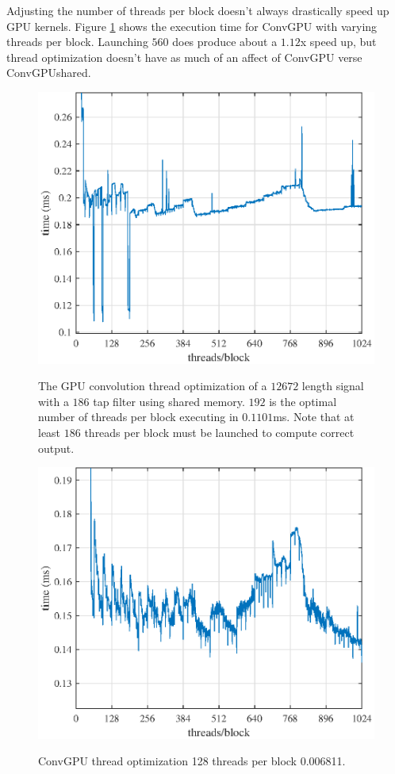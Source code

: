 Adjusting the number of threads per block doesn't always drastically speed up GPU kernels.
Figure \ref{fig:ConvGPU_shared_12672_186taps} shows the execution time for ConvGPU with varying threads per block.
Launching $560$ does produce about a $1.12$x speed up, but thread optimization doesn't have as much of an affect of ConvGPU verse ConvGPUshared.
\begin{figure}
	\caption{The GPU convolution thread optimization of a $12672$ length signal with a $186$ tap filter using shared memory. $192$ is the optimal number of threads per block executing in $0.1101$ms. Note that at least $186$ threads per block must be launched to compute correct output.}
	\centering\includegraphics[width=5in]{figures/gpu_intro/ConvGPU_shared_12672_186taps.eps}
	\label{fig:ConvGPU_shared_12672_186taps}
\end{figure}
\begin{figure}
	\caption{ConvGPU thread optimization 128 threads per block 0.006811.}
	\centering\includegraphics[width=5in]{figures/gpu_intro/ConvGPU_global_12672_186taps.eps}
	\label{fig:ConvGPU_global_12672_186taps}
\end{figure}

